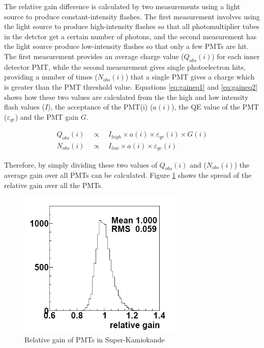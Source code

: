 The relative gain difference is calculated by two measurements using a light source to produce constant-intensity flashes. The first measurement involves using the light source to produce high-intensity flashes so that all photomultiplier tubes in the detctor get a certain number of photons, and the second measurement has the light source produce low-intensity flashes so that only a few PMTs are hit. The first measurement provides an average charge value ($Q_{o b s}(i)$) for each inner detector PMT, while the second measurement gives single photoelectron hits, providing a number of times ($N_{o b s}(i)$) that a single PMT gives a charge which is greater than the PMT threshold value. Equations \ref{eq:gaineq1} and \ref{eq:gaineq2} shows how these two values are calculated from the the high and low intensity flash values ($I$), the acceptance of the PMT(i) ($a(i)$), the QE value of the PMT ($\varepsilon_{q e}$) and the PMT gain $G$. 

\begin{align}
Q_{o b s}(i) \quad \propto \quad I_{high} \times a(i) \times \varepsilon_{q e}(i) \times G(i) \label{eq:gaineq1} \\
N_{o b s}(i) \quad \propto \quad I_{low} \times a(i) \times \varepsilon_{q e}(i) \label{eq:gaineq2}
\end{align}


Therefore, by simply dividing these two values of $Q_{o b s}(i)$ and ($N_{o b s}(i)$) the average gain over all PMTs can be calculated.  Figure \ref{fig:relativegain} shows the spread of the relative gain over all the PMTs. 

\begin{figure}
\centering
    \includegraphics[width=0.7\textwidth]{Figures/relativegain.png}
\caption{Relative gain of PMTs in Super-Kamiokande}
    \label{fig:relativegain}
\end{figure}

